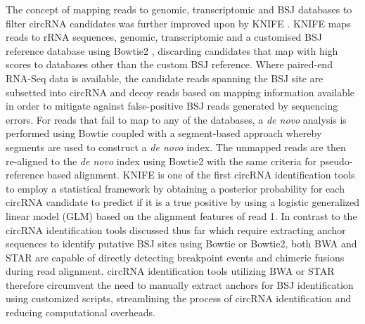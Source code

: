 The concept of mapping reads to genomic, transcriptomic and BSJ databases to filter circRNA candidates was further improved upon by KNIFE \cite{KNIFE}. KNIFE maps reads to rRNA sequences, genomic, transcriptomic and a customised BSJ reference database using Bowtie2 \cite{Langmead2021}, discarding candidates that map with high scores to databases other than the custom BSJ reference. Where paired-end RNA-Seq data is available, the candidate reads spanning the BSJ site are subsetted into circRNA and decoy reads based on mapping information available in order to mitigate against false-positive BSJ reads generated by sequencing errors. For reads that fail to map to any of the databases, a \textit{de novo} analysis is performed using Bowtie coupled with a segment-based approach whereby segments are used to construct a \textit{de novo} index. The unmapped reads are then re-aligned to the \textit{de novo} index using Bowtie2 with the same criteria for pseudo-reference based alignment. KNIFE is one of the first circRNA identification tools to employ a statistical framework by obtaining a posterior probability for each circRNA candidate to predict if it is a true positive by using a logistic generalized linear model (GLM) based on the alignment features of read 1. In contrast to the circRNA identification tools discussed thus far which require extracting anchor sequences to identify putative BSJ sites using Bowtie or Bowtie2, both BWA \cite{BWA} and STAR \cite{STAR} are capable of directly detecting breakpoint events and chimeric fusions during read alignment. circRNA identification tools utilizing BWA or STAR therefore circumvent the need to manually extract anchors for BSJ identification using customized scripts, streamlining the process of circRNA identification and reducing computational overheads. \par 
